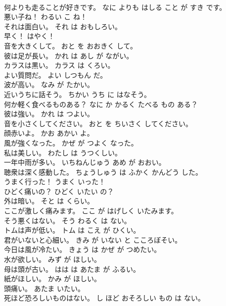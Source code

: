 \documentclass[8pt]{extreport}
\begin{document}
\begin{CJK}{UTF8}{min}
\\	何よりも走ることが好きです。	なに よりも はしる こと が すき です。	
\\	悪い子ね！	わるい こ ね！	
\\	それは面白い。	それ は おもしろい。	
\\	早く！	はやく！	
\\	音を大きくして。	おと を おおきく して。	
\\	彼は足が長い。	かれ は あし が ながい。	
\\	カラスは黒い。	カラス は くろい。	
\\	よい質問だ。	よい しつもん だ。	
\\	波が高い。	なみ が たかい。	
\\	近いうちに話そう。	ちかい うち に はなそう。	
\\	何か軽く食べるものある？	なに か かるく たべる もの ある？	
\\	彼は強い。	かれ は つよい。	
\\	音を小さくしてください。	おと を ちいさく してください。	
\\	顔赤いよ。	かお あかい よ。	
\\	風が強くなった。	かぜ が つよく なった。	
\\	私は美しい。	わたし は うつくしい。	
\\	一年中雨が多い。	いちねんじゅう あめ が おおい。	
\\	聴衆は深く感動した。	ちょうしゅう は ふかく かんどう した。	
\\	うまく行った！	うまく いった！	
\\	ひどく痛いの？	ひどく いたい の？	
\\	外は暗い。	そと は くらい。	
\\	ここが激しく痛みます。	ここ が はげしく いたみます。	
\\	そう悪くはない。	そう わるく は ない。	
\\	トムは声が低い。	トム は こえ が ひくい。	
\\	君がいないと心細い。	きみ が いない と こころぼそい。	
\\	今日は風が冷たい。	きょう は かぜ が つめたい。	
\\	水が欲しい。	みず が ほしい。	
\\	母は頭が古い。	はは は あたま が ふるい。	
\\	紙がほしい。	かみ が ほしい。	
\\	頭痛い。	あたま いたい。	
\\	死ほど恐ろしいものはない。	し ほど おそろしい もの は ない。	

\end{CJK}
\end{document}

